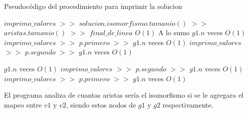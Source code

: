 %
\begin{algorithm}[H]
  \begin{algorithmic}[1]
  \caption{Pseudocódigo del procedimiento para imprimir la solucion}
  \label{algo:ap-3}
    \State $imprimo\_valores$ $>>$ $solucion.isomorfismo.tamanio()$ $>>$ $aristas.tamanio()$  $>>$ $final\_de\_linea$
    \Comment $O(1)$
        \Comment A lo sumo $g1.n$ veces $O(1)$
		    \State $imprimo\_valores$ $>>$ $p.primero$ $>>$
        \Comment $g1.n$ veces $O(1)$
		 \Else
		    \State $imprimo\_valores$ $>>$ $p.segundo$ $>>$
        \Comment $g1.n$ veces $O(1)$

		 \EndIf 
		
    \EndFor
        \Comment $g1.n$ veces $O(1)$
		    \State $imprimo\_valores$ $>>$ $p.segundo$ $>>$
        \Comment $g1.n$ veces $O(1)$
		 \Else
		    \State $imprimo\_valores$ $>>$ $p.primero$ $>>$ 
        \Comment $g1.n$ veces $O(1)$

		 \EndIf 
		
    \EndFor
		\EndProcedure
	\end{algorithmic}
\end{algorithm}

El programa analiza de cuantas aristas sería el isomorfismo si se le agregara el mapeo entre $v1$ y $v2$, siendo estos nodos de $g1$ y $g2$ respectivamente.

